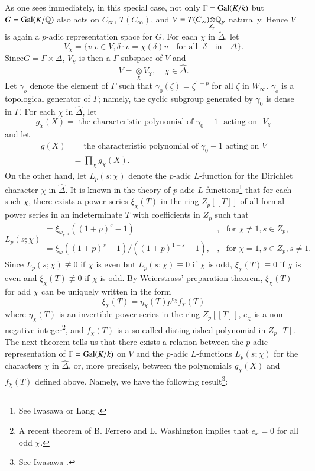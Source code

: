 As one sees immediately, in this special case, not only $\Gamma=\operatorname{Gal}(K/k)$ but $G=\operatorname{Gal}(K/\mathbb{Q})$ also acts on $C_{\infty}$, $T(C_{\infty})$, and $V=\foprod{T(C_{\infty})}{\mathbb{Q}_{p}}{Z_{p}}$ naturally. Hence $V$ is again a $p$-adic representation space for $G$. For each $\chi$ in $\widetilde{\Delta}$, let
$$
V_{\chi}=\{v|v\in V,\delta\cdot v=\chi(\delta)v\text{~~ for all~~} \delta \text{~~ in ~~}\Delta\}.
$$
Since\pageoriginale $G=\Gamma\times \Delta$, $V_{\chi}$ is then a $\Gamma$-subspace of $V$ and
$$
V={\displaystyle{\mathop{\otimes}\limits_{\chi}}}V_{\chi},\quad \chi \in \widehat{\Delta}.
$$
Let $\gamma_{o}$ denote the element of $\Gamma$ such that $\gamma_{0}(\zeta)=\zeta^{1+p}$ for all $\zeta$ in $W_{\infty}$. $\gamma_{o}$ is a topological generator of $\Gamma$; namely, the cyclic subgroup generated by $\gamma_{0}$ is dense in $\Gamma$. For each $\chi$ in $\widehat{\Delta}$, let
$$
g_{\chi}(X)=\text{~the characteristic polynomial of } \gamma_{0}-1\text{~ acting on~ } V_{\chi}
$$
and let
\begin{align*}
g(X) &= \text{the characteristic polynomial of $\gamma_{0}-1$ acting on $V$}\\
&= \prod\limits_{\chi}g_{\chi}(X).
\end{align*}
On the other hand, let $L_{p}(s;\chi)$ denote the $p$-adic $L$-function for the Dirichlet character $\chi$ in $\widehat{\Delta}$. It is known in the theory of $p$-adic $L$-functions\footnote[2]{See Iwasawa \cite{art4-key4} or Lang \cite{art4-key6}.} that for each such $\chi$, there exists a power series $\xi_{\chi}(T)$ in the ring $Z_{p}[[T]]$ of all formal power series in an indeterminate $T$ with coefficients in $Z_{p}$ such that
$$
L_{p}(s;\chi)
\begin{array}{ll}
=\xi_{\omega_{\chi^{-1}}}((1+p)^{s}-1) & ,\text{~ for } \chi\neq 1, s\in Z_{p},\\
=\xi_{\omega}((1+p)^{s}-1)/((1+p)^{1-s}-1), & ,\text{~ for } \chi=1, s\in Z_{p},s\neq 1.
\end{array}
$$
Since $L_{p}(s;\chi)\nequiv 0$ if $\chi$ is even but $L_{p}(s;\chi)\equiv 0$ if $\chi$ is odd, $\xi_{\chi}(T)\equiv 0$ if $\chi$ is even and $\xi_{\chi}(T)\nequiv 0$ if $\chi$ is odd. By Weierstrass' preparation theorem, $\xi_{\chi}(T)$ for add $\chi$ can be uniquely written in the form
$$
\xi_{\chi}(T)=\eta_{\chi}(T)p^{e_{\chi}}f_{\chi}(T)
$$
where $\eta_{\chi}(T)$ is an invertible power series in the ring $Z_{p}[[T]]$, $e_{\chi}$ is a non-negative integer\footnote[3]{A recent theorem of B. Ferrero and L. Washington implies that $e_{x}=0$ for all odd $\chi$.}, and $f_{\chi}(T)$ is a so-called distinguished polynomial in $Z_{p}[T]$. The next theorem tells us that there exists a relation between the $p$-adic representation of $\Gamma=\operatorname{Gal}(K/k)$ on $V$ and the $p$-adic $L$-functions $L_{p}(s;\chi)$ for the characters $\chi$ in $\widehat{\Delta}$, or, more precisely, between the polynomials $g_{\chi}(X)$ and $f_{\chi}(T)$ defined above. Namely, we have the following result\footnote[4]{See Iwasawa \cite{art4-key3}.}: 

